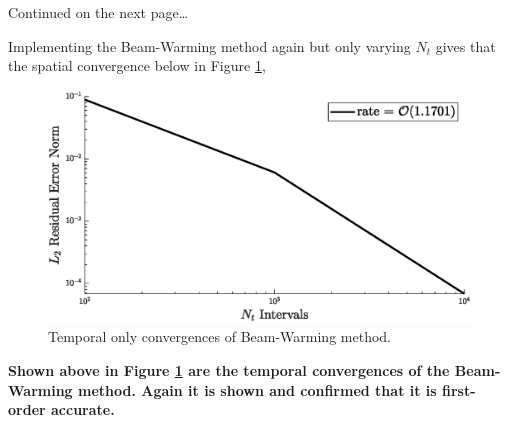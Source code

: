 \begin{enumerate}[label=\alph*., start = 1]
    \vfill
    Continued on the next page\ldots

    \pagebreak

    Implementing the Beam-Warming method again but only varying $N_t$ gives that the spatial convergence below in Figure \ref{fig:q2_BW_nt},

    \begin{figure}[h]
        \centering
        \includegraphics[width = 0.9\linewidth]{q2/BW_convergence_nt.eps}
        \caption{Temporal only convergences of Beam-Warming method.}
        \label{fig:q2_BW_nt}
    \end{figure}

    \begin{fminipage}{0.9\linewidth}
        \textbf{Shown above in Figure \ref{fig:q2_BW_nt} are the temporal convergences of the Beam-Warming method. Again it is shown and confirmed that it is first-order accurate.}
    \end{fminipage}



\end{enumerate}
